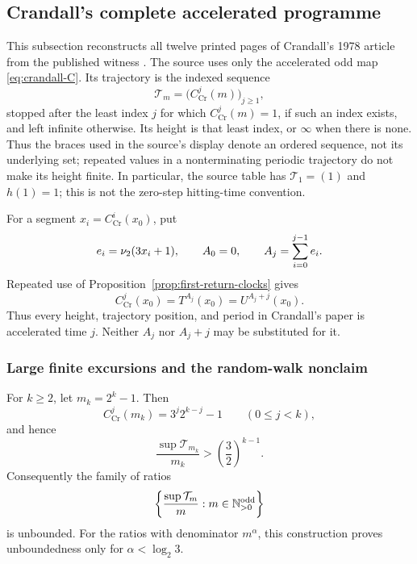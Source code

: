 \subsection{Crandall's complete accelerated programme}
\label{subsec:Crandall-complete-audit}

This subsection reconstructs all twelve printed pages of Crandall's 1978
article from the published witness \cite[pp.~1281--1292]{Crandall1978}.  The
source uses only the accelerated odd map \eqref{eq:crandall-C}.  Its
trajectory is the indexed sequence
\[
 \mathcal T_m=\bigl(C_{\mathrm{Cr}}^j(m)\bigr)_{j\geq1},
\]
stopped after the least index $j$ for which $C_{\mathrm{Cr}}^j(m)=1$, if
such an index exists, and left infinite otherwise.  Its height is that least
index, or $\infty$ when there is none.  Thus the braces used in the source's
display denote an ordered sequence, not its underlying set; repeated values
in a nonterminating periodic trajectory do not make its height finite.  In
particular, the source table has $\mathcal T_1=(1)$ and $h(1)=1$; this is not
the zero-step hitting-time convention.

For a segment $x_i=C_{\mathrm{Cr}}^i(x_0)$, put
\begin{equation}
\label{eq:Crandall-cumulative-time}
 e_i=\nu_{2}(3x_i+1),
 \qquad
 A_0=0,
 \qquad
 A_j=\sum_{i=0}^{j-1}e_i.
\end{equation}
Repeated use of Proposition~\ref{prop:first-return-clocks} gives
\begin{equation}
\label{eq:Crandall-three-clocks}
 C_{\mathrm{Cr}}^j(x_0)=T^{A_j}(x_0)=U^{A_j+j}(x_0).
\end{equation}
Thus every height, trajectory position, and period in Crandall's paper is
accelerated time $j$.  Neither $A_j$ nor $A_j+j$ may be substituted for it.

\subsubsection{Large finite excursions and the random-walk nonclaim}

\begin{proposition}
\label{prop:Crandall-excursions}
For $k\geq2$, let $m_k=2^k-1$.  Then
\begin{equation}
\label{eq:Crandall-excursion-orbit}
 C_{\mathrm{Cr}}^j(m_k)=3^j2^{k-j}-1
 \qquad(0\leq j<k),
\end{equation}
and hence
\begin{equation}
\label{eq:Crandall-excursion-ratio}
 \frac{\sup\mathcal T_{m_k}}{m_k}>
 \left(\frac32\right)^{k-1}.
\end{equation}
Consequently the family of ratios
\[
 \left\{\frac{\sup\mathcal T_m}{m}:m\in\mathbb{N}_{>0}^{\mathrm{odd}}\right\}
\]
is unbounded.  For the ratios with denominator $m^\alpha$, this construction
proves unboundedness only for $\alpha<\log_2 3$.
\end{proposition}

